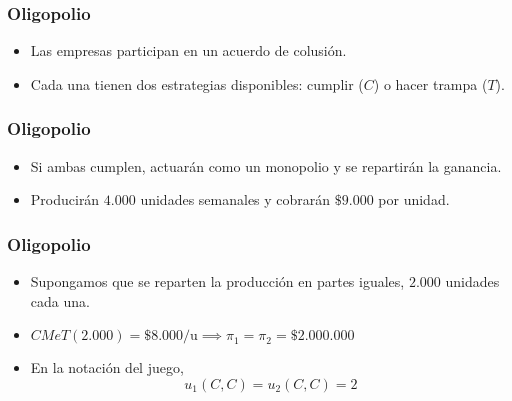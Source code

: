 \documentclass[dvipsnames,table,leqno]{beamer}
\newcommand{\peq}[1]{{\scriptscriptstyle{#1}}}
\newcommand{\rp}[1]{\left(#1\right)}
\begin{document}
		\begin{frame}
			\frametitle{Oligopolio}
			\begin{itemize}
				\item Las empresas participan en un acuerdo de colusión.
				\item Cada una tienen dos estrategias disponibles: cumplir ($C$) o hacer trampa ($T$).
			\end{itemize}
		\end{frame}			
	
		\begin{frame}
			\frametitle{Oligopolio}
			\begin{itemize}
				\item Si ambas cumplen, actuarán como un monopolio y se repartirán la ganancia.
				\item Producirán $4.000$ unidades semanales y cobrarán $\$9.000$ por unidad.
			\end{itemize}
		\end{frame}					

		\begin{frame}
			\frametitle{Oligopolio}
			\begin{itemize}
				\item Supongamos que se reparten la producción en partes iguales, $2.000$ unidades cada una.
				\item $CMeT\rp{2.000}=\$8.000/\text{u}\implies\pi_\peq{1}=\pi_\peq{2}=\$2.000.000$
				\item En la notación del juego, $$u_\peq{1}\rp{C,C}=u_\peq{2}\rp{C,C}=2$$
			\end{itemize}
		\end{frame}	
\end{document}
